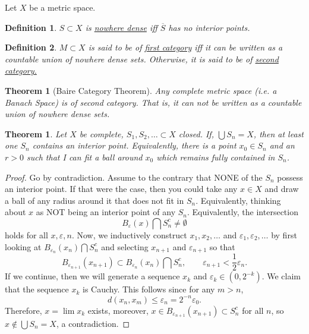 \documentclass[letterpaper,twoside,11pt]{article}
\theoremstyle{mystyle}
\newtheorem{theorem}{Theorem}[section]
\newtheorem*{thm}{Theorem}		%
\newtheorem{definition}{Definition}[section]
\begin{document}
Let $X$ be a metric space. 
\begin{definition}
  $S\subset X$ is \underline{nowhere dense} iff $\overline S$ has no interior points. 
\end{definition}
\begin{definition}
  $M\subset X$ is said to be of \underline{first category} iff it can be written as a countable union of nowhere dense sets. Otherwise, it is said to be of \underline{second category. }
\end{definition}

\begin{tcolorbox}[colback=red!5!white,colframe=red!75!black]
\begin{thm}[Baire Category Theorem]
  Any complete metric space (i.e. a Banach Space) is of second category. That is, it can not be written as a countable union of nowhere dense sets. 
\end{thm}
\end{tcolorbox}
\begin{tcolorbox}[colback=red!5!white,colframe=red!75!black]
\begin{theorem}
  Let $X$ be complete, $S_1, S_2, \dots \subset X$ closed. If, $\bigcup {{S_n}}  = X$, then at least one $S_n$ contains an interior point. \color{gray}Equivalently, there is a point $x_0\in S_n$ and an $r>0$ such that I can fit a ball around $x_0$ which remains fully contained in $S_n$. \color{black}
\end{theorem}
\end{tcolorbox}
\begin{proof}
  Go by contradiction. Assume to the contrary that NONE of the $S_n$ possess an interior point. If that were the case, then you could take any $x\in X$ and draw a ball of any radius around it that does not fit in $S_n$. \color{gray} Equivalently, thinking about $x$ as NOT being an interior point of any $S_n$. \color{black} Equivalently, the intersection 
  \[B_\varepsilon(x) \bigcap S_n^c \neq \emptyset\]
  holds for all $x, \varepsilon, n$. 
  Now, we inductively construct $x_1, x_2,\dots$ and $\varepsilon_1, \varepsilon_2,\dots$ by first looking at $B_{\varepsilon_n}(x_n)\bigcap S_n^c$ and selecting $x_{n+1}$ and $\varepsilon_{n+1}$ so that \[B_{\varepsilon_{n+1}} (x_{n+1})\subset B_{\varepsilon_n}(x_n)\bigcap S_n^c,\qquad \varepsilon_{n+1}< \frac{1}{2}\varepsilon_n.\]
  If we continue, then we will generate a sequence $x_k$ and $\varepsilon_k \in (0, 2^{-k})$. We claim that the sequence $x_k$ is Cauchy. This follows since for any $m>n$, \[d(x_n, x_m)\leq \varepsilon_n = 2^{-n}\varepsilon_0.\] Therefore, $x = \lim x_k$ exists, moreover, $x\in B_{\varepsilon_{n+1}}(x_{n+1})\subset S^c_n$ for all $n$, so $x\notin \bigcup S_n = X$, a contradiction. 
\end{proof}
\end{document}
